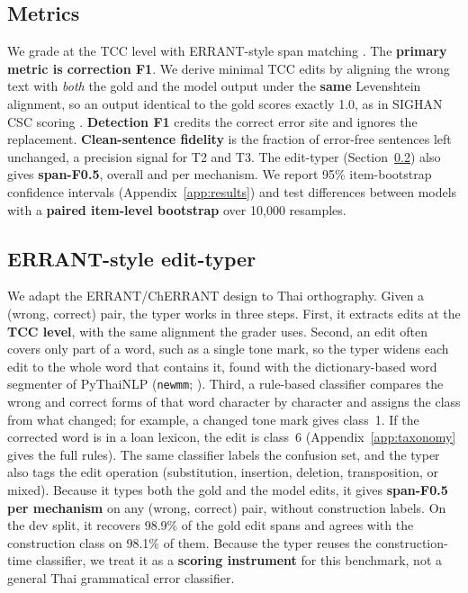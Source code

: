 \documentclass[11pt]{article}
\begin{document}
\subsection{Metrics}
We grade at the TCC level with ERRANT-style span matching \citep{bryant-etal-2017-automatic}.
The \textbf{primary metric is correction F1}. We derive minimal TCC edits by aligning the wrong
text with \emph{both} the gold and the model output under the \textbf{same} Levenshtein
alignment, so an output identical to the gold scores exactly 1.0, as in SIGHAN CSC scoring
\citep{tseng-etal-2015-introduction}. \textbf{Detection F1} credits the correct error site and
ignores the replacement. \textbf{Clean-sentence fidelity} is the fraction of error-free sentences
left unchanged, a precision signal for T2 and T3. The edit-typer (Section~\ref{sec:typer}) also
gives \textbf{span-F0.5}, overall and per mechanism. We report 95\% item-bootstrap confidence
intervals (Appendix~\ref{app:results}) and test differences between models with a
\textbf{paired item-level bootstrap} \citep{koehn-2004-statistical} over 10{,}000 resamples.

\subsection{ERRANT-style edit-typer}
\label{sec:typer}
We adapt the ERRANT/ChERRANT design
\citep{bryant-etal-2017-automatic,zhang-etal-2022-mucgec} to Thai orthography. Given a (wrong,
correct) pair, the typer works in three steps. First, it extracts edits at the \textbf{TCC level},
with the same alignment the grader uses. Second, an edit often covers only part of a word, such
as a single tone mark, so the typer widens each edit to the whole word that contains it, found
with the dictionary-based word segmenter of PyThaiNLP (\texttt{newmm};
\citealp{phatthiyaphaibun-etal-2023-pythainlp}). Third, a rule-based classifier compares the
wrong and correct forms of that word character by character and assigns the class from what
changed; for example, a changed tone mark gives class~1. If the corrected word is in a loan
lexicon, the edit is class~6 (Appendix~\ref{app:taxonomy} gives the full rules). The same
classifier labels the confusion set, and the typer also tags the edit operation (substitution,
insertion, deletion, transposition, or mixed). Because it types both the gold and the model edits, it gives
\textbf{span-F0.5 per mechanism} on any (wrong, correct) pair, without construction labels. On
the dev split, it recovers 98.9\% of the gold edit spans and agrees with the
construction class on 98.1\% of them. Because the typer reuses the construction-time classifier,
we treat it as a \textbf{scoring instrument} for this benchmark, not a general Thai grammatical
error classifier.
\end{document}

